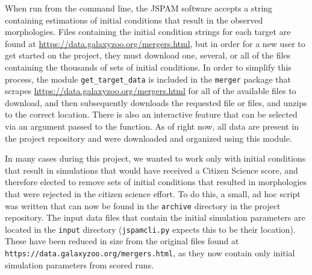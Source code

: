 When run from the command line, the JSPAM software accepts a string containing
estimations of initial conditions that result in the observed morphologies.
Files containing the initial condition strings for each target are found at
\url{https://data.galaxyzoo.org/mergers.html}, but in order for a new user to
get started on the project, they must download one, several, or all of the files
containing the thousands of sets of initial conditions. In order to simplify
this process, the module \texttt{get\_target\_data} is included in the
\texttt{merger} package that scrapes
\url{https://data.galaxyzoo.org/mergers.html} for all of the available files to
download, and then subsequently downloads the requested file or files, and
unzips to the correct location. There is also an interactive feature that can be
selected via an argument passed to the function. As of right now, all data are
present in the project repository and were downloaded and organized using this
module.

In many cases during this project, we wanted to work only with
initial conditions that result in simulations that would have received a
Citizen Science score, and therefore elected to remove
sets of initial conditions that resulted in morphologies that were rejected
in the citizen science effort. To do this, a small, ad hoc script was written
that can now be found in the \texttt{archive} directory in the project
repository.
The input data files that contain the initial simulation
parameters are located in the \texttt{input} directory
(\texttt{jspamcli.py} expects this to be their location).
These have been reduced in size from the
original files found at \texttt{https://data.galaxyzoo.org/mergers.html}, as
they now contain only initial simulation parameters from scored runs.
